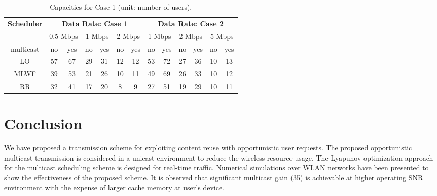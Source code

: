 \documentclass[conference]{IEEEtran}
\newcommand{\0}{\vect{0}}
\newcommand{\1}{\vect{1}}
\begin{document}
\begin{table}[t]
\caption{Capacities for Case 1 (unit: number of users).}
\label{tab:s3}
\centering
\setlength{\tabcolsep}{.4em}
\resizebox{.48\textwidth }{!}
{
\begin{tabular}{|c|c c|c c|c c||c c|c c|c c|}
\hline
\multirow{2}{*}{\bfseries Scheduler} & \multicolumn{6}{c||}{\bfseries Data Rate: Case 1}&\multicolumn{6}{c|}{\bfseries Data Rate: Case 2} \\ \cline{2-13}
                           & \multicolumn{2}{c|}{0.5 Mbps}    & \multicolumn{2}{c|}{1 Mbps}   & \multicolumn{2}{c||}{2 Mbps}           & \multicolumn{2}{c|}{1 Mbps}    & \multicolumn{2}{c|}{2 Mbps}   & \multicolumn{2}{c|}{5 Mbps}          \\ \hline
multicast                  & no & yes      & no & yes  & no & yes        & no & yes      & no & yes  & no & yes        \\\hline\hline
LO                         & 57&67         & 29&31         & 12&12      & 53&72        & 27&36        & 10&13       \\ \hline
MLWF                       & 39&53         & 21&26         & 10&11     & 49&69        & 26&33        & 10&12       \\ \hline
RR                         & 32&41         & 17&20         &  8&9      & 27&51        & 19&29        & 10&11       \\ \hline
\end{tabular}
}
\end{table}







\section{Conclusion}\label{sec:con}

We have proposed a transmission scheme for exploiting content reuse with opportunistic user requests. The proposed opportunistic multicast transmission is considered in a unicast environment to reduce the wireless resource usage. The Lyapunov optimization approach for the multicast scheduling scheme is designed for real-time traffic. Numerical simulations over WLAN networks have been presented to show the effectiveness of the proposed scheme. It is observed that significant multicast gain (35) is achievable at higher operating SNR environment with the expense of larger cache memory at user's device.
\end{document}
